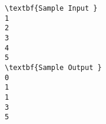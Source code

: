 \begin{verbatim}
\textbf{Sample Input }
1
2 
3 
4
5 
\textbf{Sample Output }
0
1 
1
3
5
\end{verbatim}